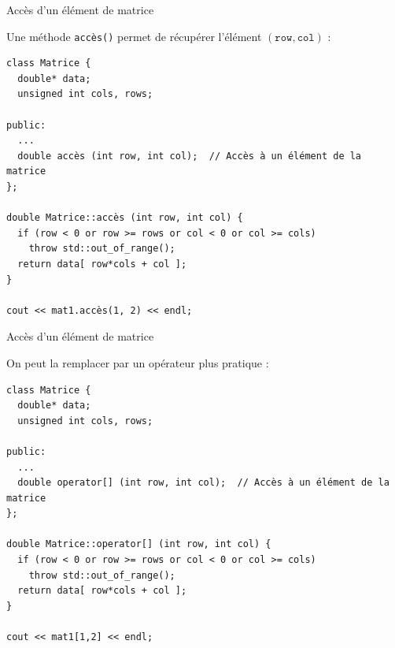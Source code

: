 \documentclass[c]{beamer}
\begin{document}
\begin{frame}[fragile]{Accès d'un élément de matrice}

Une méthode \texttt{accès()} permet de récupérer l'élément $(\mathtt{row},\mathtt{col})$ :\\
\begin{verbatim}
class Matrice {
  double* data;
  unsigned int cols, rows;

public:
  ...
  double accès (int row, int col);  // Accès à un élément de la matrice
};

double Matrice::accès (int row, int col) {
  if (row < 0 or row >= rows or col < 0 or col >= cols)
    throw std::out_of_range();
  return data[ row*cols + col ];
}

cout << mat1.accès(1, 2) << endl;
\end{verbatim}

\end{frame}

\begin{frame}[fragile]{Accès d'un élément de matrice}

On peut la remplacer par un opérateur plus pratique :\\
\begin{verbatim}
class Matrice {
  double* data;
  unsigned int cols, rows;

public:
  ...
  double operator[] (int row, int col);  // Accès à un élément de la matrice
};

double Matrice::operator[] (int row, int col) {
  if (row < 0 or row >= rows or col < 0 or col >= cols)
    throw std::out_of_range();
  return data[ row*cols + col ];
}

cout << mat1[1,2] << endl;
\end{verbatim}

\end{frame}

\end{document}
